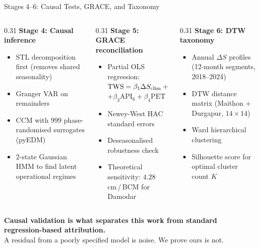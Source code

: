 \documentclass[10pt]{beamer}
\begin{document}
\begin{frame}{Stages 4--6: Causal Tests, GRACE, and Taxonomy}
  \begin{columns}[T]
    \begin{column}{0.31\textwidth}
      \small\textbf{Stage 4: Causal inference}
      \begin{itemize}\footnotesize
        \item STL decomposition first
              (removes shared seasonality)
        \item Granger VAR on remainders
        \item CCM with 999 phase-randomised
              surrogates (pyEDM)
        \item 2-state Gaussian HMM to find
              latent operational regimes
      \end{itemize}
    \end{column}
    \begin{column}{0.31\textwidth}
      \small\textbf{Stage 5: GRACE reconciliation}
      \begin{itemize}\footnotesize
        \item Partial OLS regression:\\
              {\scriptsize
              $\text{TWS} = \beta_1 \Delta S_{\rm clim}
              + \beta_2 \Delta S_{\rm anthro}$
              $+ \beta_3 \text{API}_6 + \beta_4 \text{PET}$}
        \item Newey-West HAC standard errors
        \item Deseasonalised robustness check
        \item Theoretical sensitivity:\newline
              $4.28$\,cm\,/\,BCM for Damodar
      \end{itemize}
    \end{column}
    \begin{column}{0.31\textwidth}
      \small\textbf{Stage 6: DTW taxonomy}
      \begin{itemize}\footnotesize
        \item Annual $\Delta S$ profiles
              (12-month segments, 2018--2024)
        \item DTW distance matrix
              (Maithon + Durgapur, $14 \times 14$)
        \item Ward hierarchical clustering
        \item Silhouette score for
              optimal cluster count $K$
      \end{itemize}
    \end{column}
  \end{columns}

  \vspace{6pt}
  {\small\centering
  \textbf{Causal validation is what separates this work from
  standard regression-based attribution.}\\
  A residual from a poorly specified model is noise.
  We prove ours is not.\par}
\end{frame}
\end{document}
